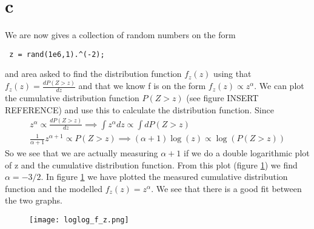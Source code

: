 \documentclass[a4paper,english, 10pt, twoside]{article}
\begin{document}
\section{c}
We are now gives a collection of random numbers on the form
\begin{lstlisting}
 z = rand(1e6,1).^(-2);
\end{lstlisting}
and area asked to find the distribution function $f_z(z)$ using that $f_z(z) = \frac{dP(Z>z)}{dz}$ and that 
we know f is on the form $f_z(z)\propto z^\alpha$. We can plot the cumulative distribution function $P(Z>z)$ 
(see figure INSERT REFERENCE) and use this to calculate the distribution function. Since 
\begin{align*}
z^\alpha\propto\frac{dP(Z>z)}{dz} \implies \int z^\alpha dz \propto \int dP(Z>z)\\
\frac{1}{\alpha+1}z^{\alpha+1} \propto P(Z>z) \implies (\alpha +1)\log(z)\propto \log(P(Z>z))
\end{align*}
So we see that we are actually measuring $\alpha +1$ if we do a double logarithmic plot of z and the 
cumulative distribution function. From this plot (figure \ref{loglog_f_z}) we find $\alpha = -3/2$. In figure 
\ref{} we have plotted the measured cumulative distribution function and the modelled $f_z(z) = z^\alpha$. 
We see that there is a good fit between the two graphs.

\begin{figure}[H]
 \centering
 \texttt{[image: loglog\_f\_z.png]}
 \label{loglog_f_z}
\end{figure}
\end{document}
